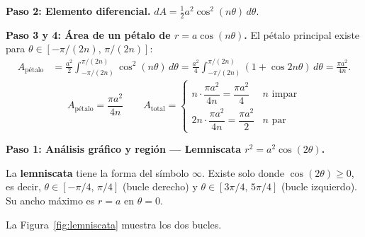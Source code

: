 \begin{example}
\begin{myproof}
\textbf{Paso 2: Elemento diferencial.}
$dA = \tfrac{1}{2}a^2\cos^2(n\theta)\,d\theta$.

\textbf{Paso 3 y 4: Área de un pétalo de $r = a\cos(n\theta)$.}
El pétalo principal existe para $\theta \in [-\pi/(2n),\, \pi/(2n)]$:
\begin{align*}
  A_{\text{pétalo}}
  &= \frac{a^2}{2}\int_{-\pi/(2n)}^{\pi/(2n)}\cos^2(n\theta)\,d\theta
   = \frac{a^2}{4}\int_{-\pi/(2n)}^{\pi/(2n)}(1+\cos 2n\theta)\,d\theta
   = \frac{\pi a^2}{4n}.
\end{align*}
\[
  \boxed{A_{\text{pétalo}} = \frac{\pi a^2}{4n}}
  \qquad
  \boxed{A_{\text{total}} =
    \begin{cases} n \cdot \dfrac{\pi a^2}{4n} = \dfrac{\pi a^2}{4} & n \text{ impar}\\[6pt]
                  2n \cdot \dfrac{\pi a^2}{4n} = \dfrac{\pi a^2}{2} & n \text{ par}
    \end{cases}}
\]

\bigskip
\textbf{Paso 1: Análisis gráfico y región — Lemniscata $r^2 = a^2\cos(2\theta)$.}

La \textbf{lemniscata} tiene la forma del símbolo $\infty$. Existe solo
donde $\cos(2\theta) \geq 0$, es decir, $\theta \in [-\pi/4,\,\pi/4]$
(bucle derecho) y $\theta \in [3\pi/4,\,5\pi/4]$ (bucle izquierdo).
Su ancho máximo es $r = a$ en $\theta = 0$.

La Figura~\ref{fig:lemniscata} muestra los dos bucles.


\end{myproof}
\end{example}

